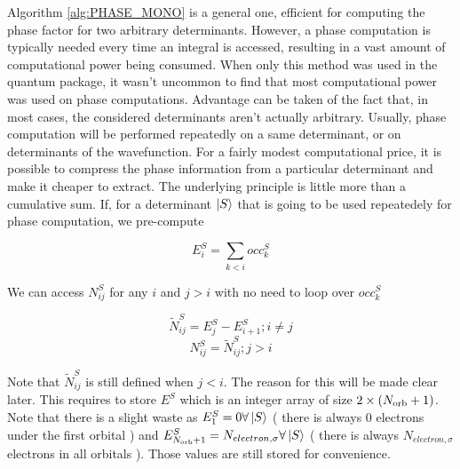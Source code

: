Algorithm \ref{alg:PHASE_MONO} is a general one, efficient for computing the phase factor for two arbitrary determinants. However, a phase computation is typically needed every time an integral is accessed, resulting in a vast amount of computational power being consumed. When only this method was used in the quantum package, it wasn't uncommon to find that most computational power was used on phase computations.
Advantage can be taken of the fact that, in most cases, the considered determinants aren't actually arbitrary. Usually, phase computation will be performed repeatedly on a same determinant, or on determinants of the wavefunction. For a fairly modest computational price, it is possible to compress the phase information from a particular determinant and make it cheaper to extract. The underlying principle is little more than a cumulative sum. If, for a determinant $\ket S$ that is going to be used repeatedely for phase computation, we pre-compute
        
$$E^S_{i} = \sum_{k < i} occ^{S}_{k}$$
        
We can access $N^S_{ij}$ for any $i$ and $j>i$ with no need to loop over $occ^{S}_{k}$

$$\tilde N^S_{ij} = E^S_j - E^S_{i+1} ; i \neq j$$
$$N^S_{ij} = \tilde N^S_{ij} ; j>i$$

Note that $\tilde N^S_{ij}$ is still defined when $j<i$. The reason for this will be made clear later.
This requires to store $E^S$ which is an integer array of size $2 \times ({N_\text{orb}}+1)$. Note that there is a slight waste as $E^S_1 = 0 \forall \ket S$ ( there is always $0$ electrons under the first orbital ) and $E^S_{{N_\text{orb}}+1} = N_{electron,\sigma} \forall \ket S$ ( there is always $N_{electron,\sigma}$ electrons in all orbitals ). Those values are still stored for convenience.

